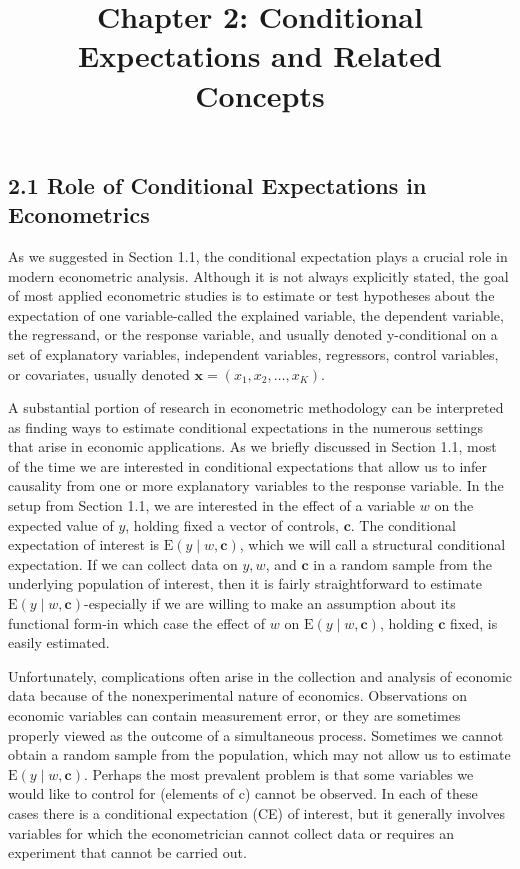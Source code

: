 \documentclass[10pt]{article}
\title{Chapter 2: Conditional Expectations and Related Concepts}
\author{}
\date{}
\begin{document}
\maketitle

\subsection*{2.1 Role of Conditional Expectations in Econometrics}
As we suggested in Section 1.1, the conditional expectation plays a crucial role in modern econometric analysis. Although it is not always explicitly stated, the goal of most applied econometric studies is to estimate or test hypotheses about the expectation of one variable-called the explained variable, the dependent variable, the regressand, or the response variable, and usually denoted y-conditional on a set of explanatory variables, independent variables, regressors, control variables, or covariates, usually denoted $\mathbf{x}=\left(x_{1}, x_{2}, \ldots, x_{K}\right)$.

A substantial portion of research in econometric methodology can be interpreted as finding ways to estimate conditional expectations in the numerous settings that arise in economic applications. As we briefly discussed in Section 1.1, most of the time we are interested in conditional expectations that allow us to infer causality from one or more explanatory variables to the response variable. In the setup from Section 1.1, we are interested in the effect of a variable $w$ on the expected value of $y$, holding fixed a vector of controls, $\mathbf{c}$. The conditional expectation of interest is $\mathrm{E}(y \mid w, \mathbf{c})$, which we will call a structural conditional expectation. If we can collect data on $y, w$, and $\mathbf{c}$ in a random sample from the underlying population of interest, then it is fairly straightforward to estimate $\mathrm{E}(y \mid w, \mathbf{c})$-especially if we are willing to make an assumption about its functional form-in which case the effect of $w$ on $\mathrm{E}(y \mid w, \mathbf{c})$, holding $\mathbf{c}$ fixed, is easily estimated.

Unfortunately, complications often arise in the collection and analysis of economic data because of the nonexperimental nature of economics. Observations on economic variables can contain measurement error, or they are sometimes properly viewed as the outcome of a simultaneous process. Sometimes we cannot obtain a random sample from the population, which may not allow us to estimate $\mathrm{E}(y \mid w, \mathbf{c})$. Perhaps the most prevalent problem is that some variables we would like to control for (elements of c) cannot be observed. In each of these cases there is a conditional expectation (CE) of interest, but it generally involves variables for which the econometrician cannot collect data or requires an experiment that cannot be carried out.
\end{document}
